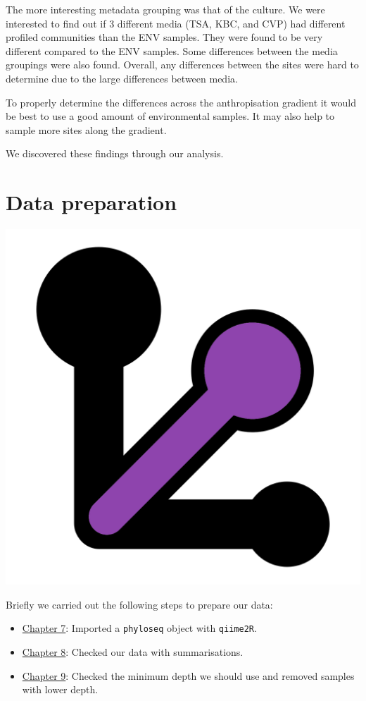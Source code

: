 \documentclass[
]{book}
\providecommand{\tightlist}{%
  \setlength{\itemsep}{0pt}\setlength{\parskip}{0pt}}
\begin{document}
The more interesting metadata grouping was that of the culture.
We were interested to find out if 3 different media (TSA, KBC, and CVP) had different profiled communities than the ENV samples.
They were found to be very different compared to the ENV samples.
Some differences between the media groupings were also found.
Overall, any differences between the sites were hard to determine due to the large differences between media.

To properly determine the differences across the anthropisation gradient it would be best to use a good amount of environmental samples.
It may also help to sample more sites along the gradient.

We discovered these findings through our analysis.

\hypertarget{data-preparation}{%
\section{Data preparation}\label{data-preparation}}

\includegraphics{figures/half_tablespoon.png}

Briefly we carried out the following steps to prepare our data:

\begin{itemize}
\tightlist
\item
  \protect\hyperlink{import_chap}{Chapter 7}: Imported a \texttt{phyloseq} object with \texttt{qiime2R}.
\item
  \protect\hyperlink{sum_phyloseq_chap}{Chapter 8}: Checked our data with summarisations.
\item
  \protect\hyperlink{mindepthchap}{Chapter 9}: Checked the minimum depth we should use and removed samples with lower depth.
\end{itemize}
\end{document}
